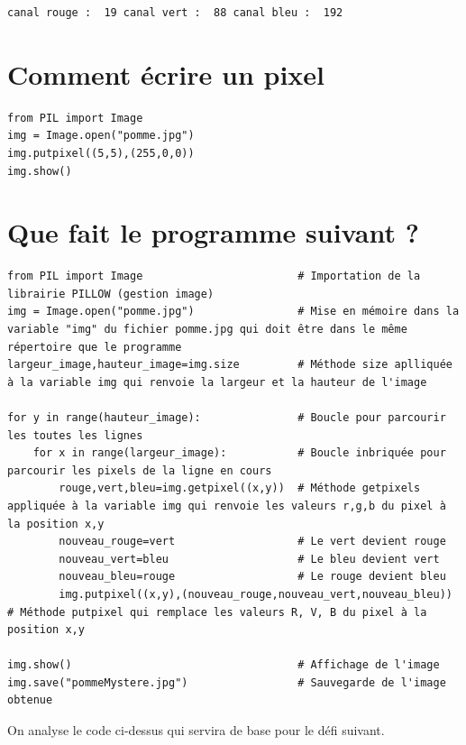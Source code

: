 \documentclass[11pt]{article}
\begin{document}
\begin{verbatim}
canal rouge :  19 canal vert :  88 canal bleu :  192
\end{verbatim}


\section{Comment écrire un pixel}
\label{sec:org019f0a7}

\begin{verbatim}
from PIL import Image
img = Image.open("pomme.jpg")
img.putpixel((5,5),(255,0,0))
img.show()
\end{verbatim}


\section{Que fait le programme suivant ?}
\label{sec:orgb906dce}

\begin{verbatim}
from PIL import Image                        # Importation de la librairie PILLOW (gestion image)
img = Image.open("pomme.jpg")                # Mise en mémoire dans la variable "img" du fichier pomme.jpg qui doit être dans le même répertoire que le programme
largeur_image,hauteur_image=img.size         # Méthode size aplliquée à la variable img qui renvoie la largeur et la hauteur de l'image

for y in range(hauteur_image):               # Boucle pour parcourir les toutes les lignes
    for x in range(largeur_image):           # Boucle inbriquée pour parcourir les pixels de la ligne en cours
        rouge,vert,bleu=img.getpixel((x,y))  # Méthode getpixels appliquée à la variable img qui renvoie les valeurs r,g,b du pixel à la position x,y
        nouveau_rouge=vert                   # Le vert devient rouge
        nouveau_vert=bleu                    # Le bleu devient vert
        nouveau_bleu=rouge                   # Le rouge devient bleu
        img.putpixel((x,y),(nouveau_rouge,nouveau_vert,nouveau_bleu)) # Méthode putpixel qui remplace les valeurs R, V, B du pixel à la position x,y 

img.show()                                   # Affichage de l'image
img.save("pommeMystere.jpg")                 # Sauvegarde de l'image obtenue
\end{verbatim}


On analyse le code ci-dessus qui servira de base pour le défi suivant.
\end{document}
